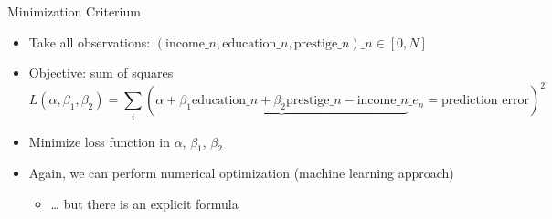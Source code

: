 \documentclass[
  ignorenonframetext,
  aspectratio=169,
]{beamer}
\providecommand{\tightlist}{%
  \setlength{\itemsep}{0pt}\setlength{\parskip}{0pt}}\usepackage{longtable,booktabs,array}
\begin{document}
\begin{frame}
\begin{block}{Minimization Criterium}
\protect\hypertarget{minimization-criterium}{}
\begin{itemize}
\tightlist
\item
  Take all observations:
  \((\text{income}\_n,\text{education}\_n,\text{prestige}\_n)\_{n\in[0,N]}\)
\item
  Objective: sum of squares
  \[ L(\alpha, \beta_1, \beta_2) = \sum_i \left( \underbrace{ \alpha + \beta_1 \text{education}\_n + \beta_2 \text{prestige}\_n - \text{income}\_n }\_{e_n=\text{prediction error} }\right)^2 \]
\item
  Minimize loss function in \(\alpha\), \(\beta_1\), \(\beta_2\)
\item
  Again, we can perform numerical optimization (machine learning
  approach)

  \begin{itemize}
  \tightlist
  \item
    \ldots{} but there is an explicit formula
  \end{itemize}
\end{itemize}
\end{block}
\end{frame}
\end{document}
